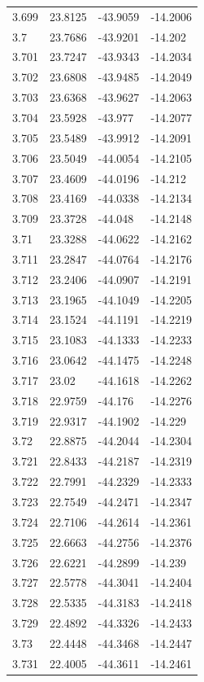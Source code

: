 \begin{tabular}{llll}
3.699 & 23.8125 & -43.9059 & -14.2006 \\
3.7 & 23.7686 & -43.9201 & -14.202 \\
3.701 & 23.7247 & -43.9343 & -14.2034 \\
3.702 & 23.6808 & -43.9485 & -14.2049 \\
3.703 & 23.6368 & -43.9627 & -14.2063 \\
3.704 & 23.5928 & -43.977 & -14.2077 \\
3.705 & 23.5489 & -43.9912 & -14.2091 \\
3.706 & 23.5049 & -44.0054 & -14.2105 \\
3.707 & 23.4609 & -44.0196 & -14.212 \\
3.708 & 23.4169 & -44.0338 & -14.2134 \\
3.709 & 23.3728 & -44.048 & -14.2148 \\
3.71 & 23.3288 & -44.0622 & -14.2162 \\
3.711 & 23.2847 & -44.0764 & -14.2176 \\
3.712 & 23.2406 & -44.0907 & -14.2191 \\
3.713 & 23.1965 & -44.1049 & -14.2205 \\
3.714 & 23.1524 & -44.1191 & -14.2219 \\
3.715 & 23.1083 & -44.1333 & -14.2233 \\
3.716 & 23.0642 & -44.1475 & -14.2248 \\
3.717 & 23.02 & -44.1618 & -14.2262 \\
3.718 & 22.9759 & -44.176 & -14.2276 \\
3.719 & 22.9317 & -44.1902 & -14.229 \\
3.72 & 22.8875 & -44.2044 & -14.2304 \\
3.721 & 22.8433 & -44.2187 & -14.2319 \\
3.722 & 22.7991 & -44.2329 & -14.2333 \\
3.723 & 22.7549 & -44.2471 & -14.2347 \\
3.724 & 22.7106 & -44.2614 & -14.2361 \\
3.725 & 22.6663 & -44.2756 & -14.2376 \\
3.726 & 22.6221 & -44.2899 & -14.239 \\
3.727 & 22.5778 & -44.3041 & -14.2404 \\
3.728 & 22.5335 & -44.3183 & -14.2418 \\
3.729 & 22.4892 & -44.3326 & -14.2433 \\
3.73 & 22.4448 & -44.3468 & -14.2447 \\
3.731 & 22.4005 & -44.3611 & -14.2461 \\

\end{tabular}
